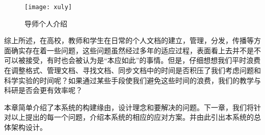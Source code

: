 \begin{enumerate}
\begin{figure}[H] 
  \centering
  \texttt{[image: xuly]}
  \caption{导师个人介绍}
  \label{fig:xfig1}
\end{figure}
综上所述，在高校，教师和学生在日常的个人文档的建立，管理，分发，传播等方面确实存在着一些问题，这些问题虽然经过多年的适应过程，表面看上去并不是不可以被接受，有时也会被认为是“本应如此”的事情。但是，仔细想想我们平时浪费在调整格式、管理文档、寻找文档、同步文档中的时间是否积压了我们考虑问题和科学实验的时间呢？如果通过某些手段使我们避免这些时间的浪费，我们的教学与科研是否会更有效率呢？

本章简单介绍了本系统的构建缘由，设计理念和要解决的问题。下一章，我们将针对以上提出的每一个问题，介绍本系统的相应的应对方案。并由此引出本系统的总体架构设计。
\end{enumerate}